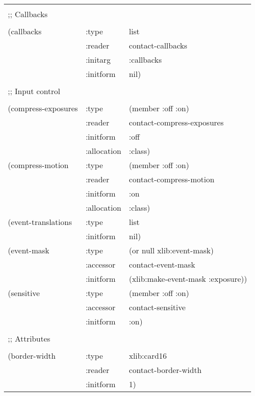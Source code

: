 \begin{flushright}
\parbox[t]{6.125in}{
\tt
\begin{tabular}{lll}
\raggedright
&\\
;; Callbacks \\
&\\
   (callbacks &          :type & list \\
&                        :reader &  contact-callbacks \\
&                        :initarg & :callbacks \\
&                        :initform &  nil) \\
&\\
;; Input control\\
&\\  
   (compress-exposures & :type & (member :off :on) \\
&                        :reader &  contact-compress-exposures \\
&                        :initform &  :off \\
&                        :allocation &  :class) \\
   (compress-motion &    :type & (member :off :on) \\
&                        :reader & contact-compress-motion \\
&                        :initform & :on \\
&                        :allocation & :class) \\ 
   (event-translations & :type & list \\
&                        :initform & nil) \\ 
   (event-mask &         :type & (or null xlib:event-mask) \\
&                        :accessor & contact-event-mask \\
&                        :initform & (xlib:make-event-mask :exposure)) \\
   (sensitive &          :type & (member :off :on) \\
&                        :accessor & contact-sensitive \\
&                        :initform & :on) \\
&\\
;; Attributes \\
&\\
   (border-width &       :type & xlib:card16 \\
&                        :reader & contact-border-width \\
&                        :initform & 1) \\

\end{tabular}}
\end{flushright}
